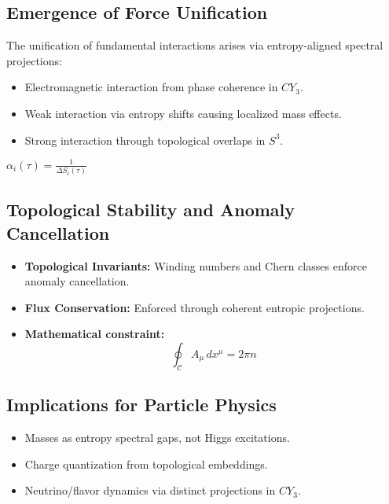 \documentclass[10.5pt,a4paper]{article}
\begin{document}
\subsection{Emergence of Force Unification}

The unification of fundamental interactions arises via entropy-aligned spectral projections:

\begin{itemize}
    \item Electromagnetic interaction from phase coherence in \( CY_3 \).
    \item Weak interaction via entropy shifts causing localized mass effects.
    \item Strong interaction through topological overlaps in \( S^3 \).
\end{itemize}

\begin{center}
    \( \alpha_i(\tau) = \frac{1}{\Delta S_i(\tau)} \)
\end{center}

\subsection{Topological Stability and Anomaly Cancellation}

\begin{itemize}
    \item \textbf{Topological Invariants:} Winding numbers and Chern classes enforce anomaly cancellation.
    \item \textbf{Flux Conservation:} Enforced through coherent entropic projections.
    \item \textbf{Mathematical constraint:} 
    \[
        \oint_{\mathcal{C}} A_\mu \, dx^\mu = 2\pi n
    \]
\end{itemize}

\subsection{Implications for Particle Physics}

\begin{itemize}
    \item Masses as entropy spectral gaps, not Higgs excitations.
    \item Charge quantization from topological embeddings.
    \item Neutrino/flavor dynamics via distinct projections in \( CY_3 \).
\end{itemize}
\end{document}
